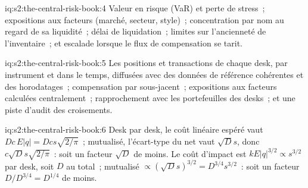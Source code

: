\begin{solution}{iq:s2:the-central-risk-book:4}
Valeur en risque (VaR) et perte de stress~; expositions aux facteurs (marché, secteur, style)~; concentration par nom au regard de sa liquidité~; délai de liquidation~; limites sur
l'ancienneté de l'inventaire~; et escalade lorsque le flux de compensation se tarit.
\end{solution}

\begin{solution}{iq:s2:the-central-risk-book:5}
Les positions et transactions de chaque desk, par instrument et dans le temps, diffusées avec des données de référence cohérentes et des horodatages~; compensation par sous-jacent~; expositions aux
facteurs calculées centralement~; rapprochement avec les portefeuilles des desks~; et une piste d'audit des croisements.
\end{solution}

\begin{solution}{iq:s2:the-central-risk-book:6}
Desk par desk, le coût linéaire espéré vaut $D c\,E|q| = D c s\sqrt{2/\pi}$~; mutualisé, l'écart-type du net vaut $\sqrt D s$, donc $c\sqrt D s\sqrt{2/\pi}$~:
soit un facteur $\sqrt D$ de moins. Le coût d'impact est $k E|q|^{3/2} \propto s^{3/2}$ par desk, soit $D$ au total~; mutualisé $\propto (\sqrt D s)^{3/2} = D^{3/4}s^{3/2}$~:
soit un facteur $D/D^{3/4} = D^{1/4}$ de moins.
\end{solution}
